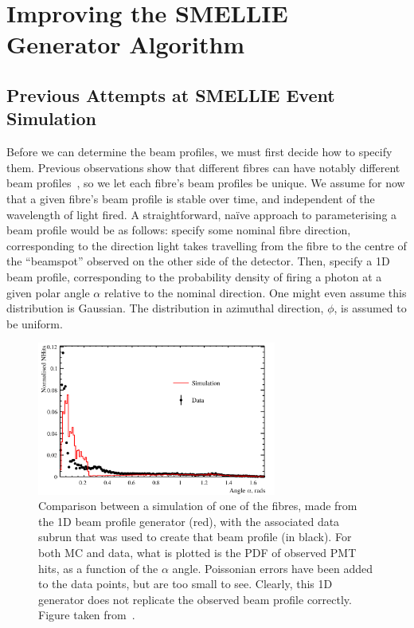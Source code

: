 \section{Improving the SMELLIE Generator Algorithm}
\subsection{Previous Attempts at SMELLIE Event Simulation}
Before we can determine the beam profiles, we must first decide how to specify them. Previous observations show that different fibres can have notably different beam profiles~\cite{majumdar_measurement_2015}, so we let each fibre's beam profiles be unique. We assume for now that a given fibre's beam profile is stable over time, and independent of the wavelength of light fired. A straightforward, na\"{i}ve approach to parameterising a beam profile would be as follows: specify some nominal fibre direction, corresponding to the direction light takes travelling from the fibre to the centre of the ``beamspot'' observed on the other side of the detector. Then, specify a 1D beam profile, corresponding to the probability density of firing a photon at a given polar angle $\alpha$ relative to the nominal direction. One might even assume this distribution is Gaussian. The distribution in azimuthal direction, $\phi$, is assumed to be uniform.

\begin{figure}
    \centering
    \includegraphics[width=0.7\textwidth]{4_SMELLIESimulation/images/1D_gen_plot.png}
    \caption[Comparison of SMELLIE between data and MC using a 1D generator]{Comparison between a simulation of one of the fibres, made from the 1D beam profile generator (red), with the associated data subrun that was used to create that beam profile (in black). For both MC and data, what is plotted is the PDF of observed PMT hits, as a function of the $\alpha$ angle. Poissonian errors have been added to the data points, but are too small to see. Clearly, this 1D generator does not replicate the observed beam profile correctly. Figure taken from~\cite{turner_measurement_2022}.}
    \label{fig:1d_gen_plot}
\end{figure}

